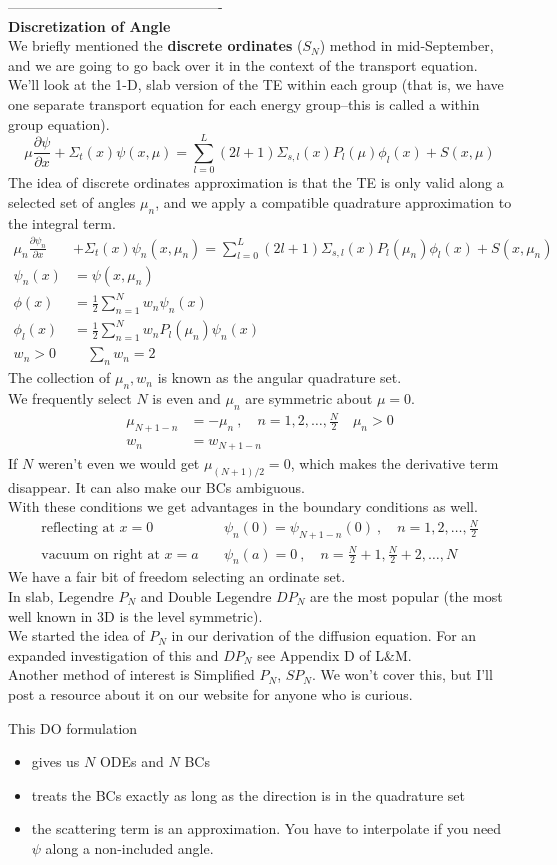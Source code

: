 \documentclass[12pt]{article}
\begin{document}
\vspace*{1 em}
----------------------------------------------\\
\textbf{Discretization of Angle}\\
We briefly mentioned the \textbf{discrete ordinates} ($S_N$) method in mid-September, and we are going to go back over it in the context of the transport equation.\\
We'll look at the 1-D, slab version of the TE within each group (that is, we have one separate transport equation for each energy group--this is called a within group equation).
\[
\mu \frac{\partial \psi}{\partial x} + \Sigma_t(x)\psi(x,\mu) = \sum_{l=0}^L (2l+1) \Sigma_{s,l}(x) P_l(\mu)\phi_l(x) + S(x,\mu)
\]
The idea of discrete ordinates approximation is that the TE is only valid along a selected set of angles $\mu_n$, and we apply a compatible quadrature approximation to the integral term.
\begin{align*}
\mu_n \frac{\partial \psi_n}{\partial x} &+ \Sigma_t(x)\psi_n(x,\mu_n) = \sum_{l=0}^L (2l+1) \Sigma_{s,l}(x) P_l(\mu_n)\phi_l(x) + S(x,\mu_n)\\
\psi_n(x) &= \psi(x,\mu_n)\\
\phi(x) &=  \frac{1}{2}\sum_{n=1}^N w_n \psi_n(x)\\
\phi_l(x) &= \frac{1}{2}\sum_{n=1}^N w_n P_l(\mu_n)\psi_n(x)\\
w_n > 0& \quad \sum_n w_n = 2
\end{align*}
The collection of $\mu_n, w_n$ is known as the angular quadrature set. \\
We frequently select $N$ is even and $\mu_n$ are symmetric about $\mu=0$.
%
\begin{align*}
\mu_{N+1-n} &= -\mu_n\:, \quad n = 1, 2, \dots, \frac{N}{2} \quad \mu_n > 0\\
w_n &= w_{N+1-n}
\end{align*}
%
If $N$ weren't even we would get $\mu_{(N+1)/2} = 0$, which makes the derivative term disappear. It can also make our BCs ambiguous.\\
With these conditions we get advantages in the boundary conditions as well.
%
\begin{align*}
\text{reflecting at } x=0 \quad &\psi_n(0) = \psi_{N+1-n}(0)\:, \quad n = 1, 2, \dots, \frac{N}{2}\\
\text{vacuum on right at } x=a \quad &\psi_n(a) = 0\:, \quad n = \frac{N}{2}+1, \frac{N}{2}+2, \dots, N
\end{align*}
%
We have a fair bit of freedom selecting an ordinate set. \\
In slab, Legendre $P_N$ and Double Legendre $DP_N$ are the most popular (the most well known in 3D is the level symmetric). \\
We started the idea of $P_N$ in our derivation of the diffusion equation. For an expanded investigation of this and $DP_N$ see Appendix D of L\&M. \\
Another method of interest is Simplified $P_N$, $SP_N$. We won't cover this, but I'll post a resource about it on our website for anyone who is curious.

This DO formulation
\begin{itemize}
\item gives us $N$ ODEs and $N$ BCs
\item treats the BCs exactly as long as the direction is in the quadrature set
\item the scattering term is an approximation. You have to interpolate if you need $\psi$ along a non-included angle.
\end{itemize}
 
\end{document}
